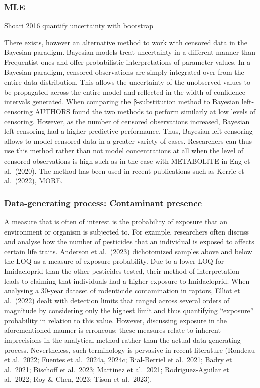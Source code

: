 \documentclass[
]{article}
\begin{document}
\subsubsection{MLE}\label{mle}

Shoari 2016 quantify uncertainty with bootstrap

There exists, however an alternative method to work with censored data
in the Bayesian paradigm. Bayesian models treat uncertainty in a
different manner than Frequentist ones and offer probabilistic
interpretations of parameter values. In a Bayesian paradigm, censored
observations are simply integrated over from the entire data
distribution. This allows the uncertainty of the unobserved values to be
propagated across the entire model and reflected in the width of
confidence intervals generated. When comparing the β-substitution method
to Bayesian left-censoring AUTHORS found the two methods to perform
similarly at low levels of censoring. However, as the number of censored
observations increased, Bayesian left-censoring had a higher predictive
performance. Thus, Bayesian left-censoring allows to model censored data
in a greater variety of cases. Researchers can thus use this method
rather than not model concentrations at all when the level of censored
observations is high such as in the case with METABOLITE in Eng et
al.~(2020). The method has been used in recent publications such as
Kerric et al.~(2022), MORE.

\subsubsection{Data-generating process: Contaminant
presence}\label{data-generating-process-contaminant-presence}

A measure that is often of interest is the probability of exposure that
an environment or organism is subjected to. For example, researchers
often discuss and analyse how the number of pesticides that an
individual is exposed to affects certain life traits. Anderson et
al.~(2023) dichotomized samples above and below the LOQ as a measure of
exposure probability. Due to a lower LOQ for Imidacloprid than the other
pesticides tested, their method of interpretation leads to claiming that
individuals had a higher exposure to Imidacloprid. When analysing a
30-year dataset of rodenticide contamination in raptors, Elliot et
al.~(2022) dealt with detection limits that ranged across several orders
of magnitude by considering only the highest limit and thus quantifying
``exposure'' probability in relation to this value. However, discussing
exposure in the aforementioned manner is erroneous; these measures
relate to inherent imprecisions in the analytical method rather than the
actual data-generating process. Nevertheless, such terminology is
pervasive in recent literature (Rondeau et al.~2022; Fuentes et
al.~2024a, 2024c; Rial-Berriel et al.~2021; Badry et al.~2021; Bischoff
et al.~2023; Martinez et al.~2021; Rodriguez-Aguilar et al.~2022; Roy \&
Chen, 2023; Tison et al.~2023).
\end{document}
